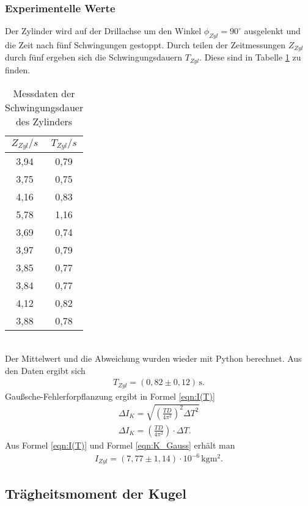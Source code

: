 \subsubsection{Experimentelle Werte}
Der Zylinder wird auf der Drillachse um den Winkel $\phi_{Zyl} = 90^{\circ}$ ausgelenkt und die Zeit
nach fünf Schwingungen gestoppt.
Durch teilen der Zeitmessungen $Z_{Zyl}$ durch fünf ergeben sich die Schwingungsdauern $T_{Zyl}$. 
Diese sind in Tabelle \ref{tab:T_Zyl} zu finden.
\begin{table}
  \centering
  \caption{Messdaten der Schwingungsdauer des Zylinders}
  \label{tab:T_Zyl}
  \begin{tabular}{c c}
    \toprule
    $Z_{Zyl}/s$ & $T_{Zyl}/s$ \\
    \midrule
    3,94 & 0,79 \\
    3,75 & 0,75 \\
    4,16 & 0,83 \\
    5,78 & 1,16 \\
    3,69 & 0,74 \\
    3,97 & 0,79 \\
    3,85 & 0,77 \\
    3,84 & 0,77 \\
    4,12 & 0,82 \\
    3,88 & 0,78 \\
    \bottomrule
  \end{tabular}
\end{table}
\\
Der Mittelwert und die Abweichung wurden wieder mit Python berechnet.
Aus den Daten ergibt sich
\begin{align*}
  T_{Zyl} = (0{,}82 \pm 0{,}12)\, \mathrm{s} .
\end{align*}
Gaußsche-Fehlerforpflanzung ergibt in Formel \ref{eqn:I(T)}
\begin{align}
  \label{eqn:K_Gauss}
  \Delta I_{K} = \sqrt{\left(\frac{TD}{4\pi^2}\right)^2 \Delta T^2} \nonumber \\
  \Delta I_{K} = \left(\frac{TD}{4\pi^2}\right) \cdot \Delta T.
\end{align}
Aus Formel \ref{eqn:I(T)} und Formel \ref{eqn:K_Gauss} erhält man
\begin{align*}
  I_{Zyl} = (7{,}77 \pm 1{,}14)\cdot 10^{-6}\, \mathrm{kgm^2}.
\end{align*}

\subsection{Trägheitsmoment der Kugel}

